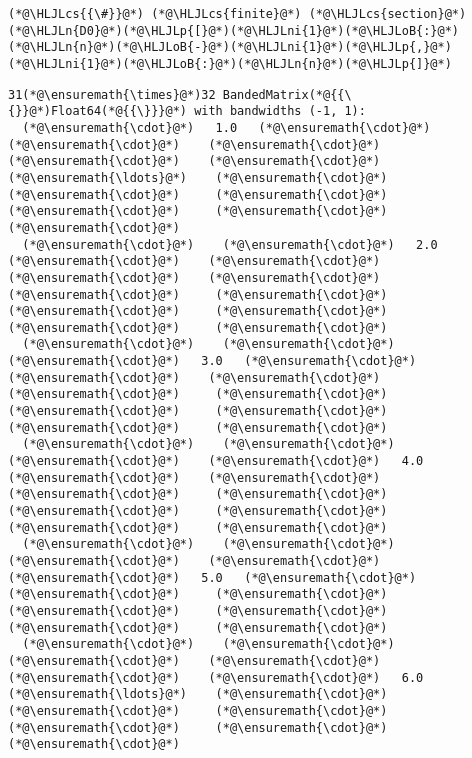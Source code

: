 \documentclass[12pt,landscape]{article}
\newcommand{\HLJLn}[1]{#1}
\newcommand{\HLJLni}[1]{\textcolor[RGB]{59,151,46}{#1}}
\newcommand{\HLJLoB}[1]{\textcolor[RGB]{102,102,102}{\textbf{#1}}}
\newcommand{\HLJLp}[1]{#1}
\newcommand{\HLJLcs}[1]{\textcolor[RGB]{153,153,119}{\textit{#1}}}
\begin{document}
{\begin{lstlisting}
(*@\HLJLcs{{\#}}@*) (*@\HLJLcs{finite}@*) (*@\HLJLcs{section}@*)
(*@\HLJLn{D0}@*)(*@\HLJLp{[}@*)(*@\HLJLni{1}@*)(*@\HLJLoB{:}@*)(*@\HLJLn{n}@*)(*@\HLJLoB{-}@*)(*@\HLJLni{1}@*)(*@\HLJLp{,}@*)(*@\HLJLni{1}@*)(*@\HLJLoB{:}@*)(*@\HLJLn{n}@*)(*@\HLJLp{]}@*)
\end{lstlisting}

\begin{lstlisting}
31(*@\ensuremath{\times}@*)32 BandedMatrix(*@{{\{}}@*)Float64(*@{{\}}}@*) with bandwidths (-1, 1):
  (*@\ensuremath{\cdot}@*)   1.0   (*@\ensuremath{\cdot}@*)    (*@\ensuremath{\cdot}@*)    (*@\ensuremath{\cdot}@*)    (*@\ensuremath{\cdot}@*)    (*@\ensuremath{\cdot}@*)   (*@\ensuremath{\ldots}@*)    (*@\ensuremath{\cdot}@*)     (*@\ensuremath{\cdot}@*)     (*@\ensuremath{\cdot}@*)     (*@\ensuremath{\cdot}@*)     (*@\ensuremath{\cdot}@*)     (*@\ensuremath{\cdot}@*) 
  (*@\ensuremath{\cdot}@*)    (*@\ensuremath{\cdot}@*)   2.0   (*@\ensuremath{\cdot}@*)    (*@\ensuremath{\cdot}@*)    (*@\ensuremath{\cdot}@*)    (*@\ensuremath{\cdot}@*)        (*@\ensuremath{\cdot}@*)     (*@\ensuremath{\cdot}@*)     (*@\ensuremath{\cdot}@*)     (*@\ensuremath{\cdot}@*)     (*@\ensuremath{\cdot}@*)     (*@\ensuremath{\cdot}@*) 
  (*@\ensuremath{\cdot}@*)    (*@\ensuremath{\cdot}@*)    (*@\ensuremath{\cdot}@*)   3.0   (*@\ensuremath{\cdot}@*)    (*@\ensuremath{\cdot}@*)    (*@\ensuremath{\cdot}@*)        (*@\ensuremath{\cdot}@*)     (*@\ensuremath{\cdot}@*)     (*@\ensuremath{\cdot}@*)     (*@\ensuremath{\cdot}@*)     (*@\ensuremath{\cdot}@*)     (*@\ensuremath{\cdot}@*) 
  (*@\ensuremath{\cdot}@*)    (*@\ensuremath{\cdot}@*)    (*@\ensuremath{\cdot}@*)    (*@\ensuremath{\cdot}@*)   4.0   (*@\ensuremath{\cdot}@*)    (*@\ensuremath{\cdot}@*)        (*@\ensuremath{\cdot}@*)     (*@\ensuremath{\cdot}@*)     (*@\ensuremath{\cdot}@*)     (*@\ensuremath{\cdot}@*)     (*@\ensuremath{\cdot}@*)     (*@\ensuremath{\cdot}@*) 
  (*@\ensuremath{\cdot}@*)    (*@\ensuremath{\cdot}@*)    (*@\ensuremath{\cdot}@*)    (*@\ensuremath{\cdot}@*)    (*@\ensuremath{\cdot}@*)   5.0   (*@\ensuremath{\cdot}@*)        (*@\ensuremath{\cdot}@*)     (*@\ensuremath{\cdot}@*)     (*@\ensuremath{\cdot}@*)     (*@\ensuremath{\cdot}@*)     (*@\ensuremath{\cdot}@*)     (*@\ensuremath{\cdot}@*) 
  (*@\ensuremath{\cdot}@*)    (*@\ensuremath{\cdot}@*)    (*@\ensuremath{\cdot}@*)    (*@\ensuremath{\cdot}@*)    (*@\ensuremath{\cdot}@*)    (*@\ensuremath{\cdot}@*)   6.0  (*@\ensuremath{\ldots}@*)    (*@\ensuremath{\cdot}@*)     (*@\ensuremath{\cdot}@*)     (*@\ensuremath{\cdot}@*)     (*@\ensuremath{\cdot}@*)     (*@\ensuremath{\cdot}@*)     (*@\ensuremath{\cdot}@*) 

\end{lstlisting}}
\end{document}
